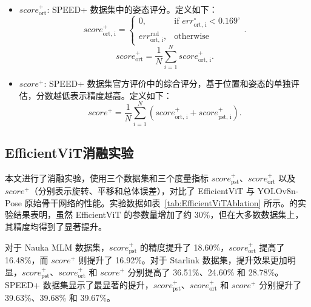 \begin{itemize}
	\item $score_{\text{ort}}^+$: SPEED+ 数据集中的姿态评分。定义如下：
	\begin{equation}
		score_{\text{ort, i}}^+ = 
		\begin{cases}
			0, & \text{if } err_{\text{ort, i}}^{\circ} < 0.169^\circ \\
			err_{\text{ort, i}}^{\text{rad}}, & \text{otherwise}
		\end{cases}.
	\end{equation}
	\begin{equation}
		score_{\text{ort}}^+ = \frac{1}{N}\sum\limits_{i=1}^N score_{\text{ort, i}}^+.
	\end{equation}
	
	\item $score^+$: SPEED+ 数据集官方评价中的综合评分，基于位置和姿态的单独评估，分数越低表示精度越高。定义如下：
	\begin{equation}
		score^+ = \frac{1}{N}\sum\limits_{i=1}^N(score_{\text{ort, i}}^+ + score_{\text{pst, i}}^+).
	\end{equation}
	
\end{itemize}



\subsection{EfficientViT消融实验}
本文进行了消融实验，使用三个数据集和三个度量指标 $score_{\text{pst}}^+$、$score_{\text{ort}}^+$ 以及 $score^+$（分别表示旋转、平移和总体误差），对比了 EfficientViT 与 YOLOv8n-Pose 原始骨干网络的性能。实验数据如表~\ref{tab:EfficientViTAblation} 所示。的实验结果表明，虽然 EfficientViT 的参数量增加了约 30\%，但在大多数数据集上，其精度均得到了显著提升。

对于 Nauka MLM 数据集，$score_{\text{pst}}^+$ 的精度提升了 18.60\%，$score_{\text{ort}}^+$ 提高了 16.48\%，而 $score^+$ 则提升了 16.92\%。对于 Starlink 数据集，提升效果更加明显，$score_{\text{pst}}^+$、$score_{\text{ort}}^+$ 和 $score^+$ 分别提高了 36.51\%、24.60\% 和 28.78\%。SPEED+ 数据集显示了最显著的提升，$score_{\text{pst}}^+$、$score_{\text{ort}}^+$ 和 $score^+$ 分别提升了 39.63\%、39.68\% 和 39.67\%。

